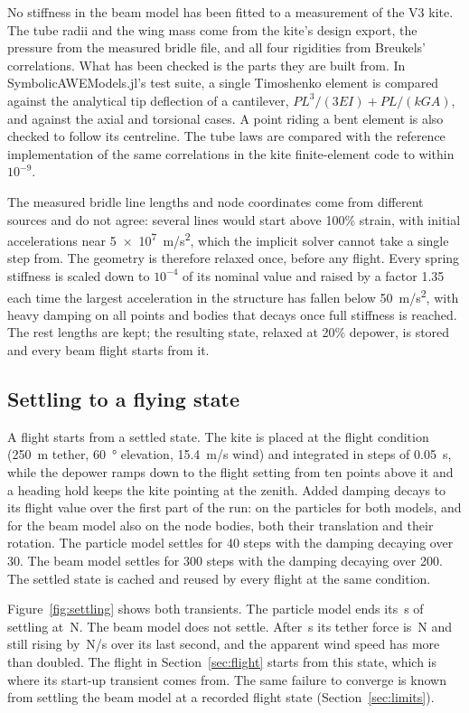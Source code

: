 \documentclass[11pt,a4paper]{article}
\begin{document}
No stiffness in the beam model has been fitted to a measurement of the V3 kite. The tube radii and the wing mass come from the kite's design export, the pressure from the measured bridle file, and all four rigidities from Breukels' correlations. What has been checked is the parts they are built from. In SymbolicAWEModels.jl's test suite, a single Timoshenko element is compared against the analytical tip deflection of a cantilever, $PL^3/(3EI)+PL/(kGA)$, and against the axial and torsional cases. A point riding a bent element is also checked to follow its centreline. The tube laws are compared with the reference implementation of the same correlations in the kite finite-element code to within $10^{-9}$.

The measured bridle line lengths and node coordinates come from different sources and do not agree: several lines would start above 100\% strain, with initial accelerations near \SI{5e7}{m/s^2}, which the implicit solver cannot take a single step from. The geometry is therefore relaxed once, before any flight. Every spring stiffness is scaled down to $10^{-4}$ of its nominal value and raised by a factor 1.35 each time the largest acceleration in the structure has fallen below \SI{50}{m/s^2}, with heavy damping on all points and bodies that decays once full stiffness is reached. The rest lengths are kept; the resulting state, relaxed at 20\% depower, is stored and every beam flight starts from it.

\subsection{Settling to a flying state}

A flight starts from a settled state. The kite is placed at the flight condition (\SI{250}{m} tether, \SI{60}{\degree} elevation, \SI{15.4}{m/s} wind) and integrated in steps of \SI{0.05}{s}, while the depower ramps down to the flight setting from ten points above it and a heading hold keeps the kite pointing at the zenith. Added damping decays to its flight value over the first part of the run: on the particles for both models, and for the beam model also on the node bodies, both their translation and their rotation. The particle model settles for 40 steps with the damping decaying over 30. The beam model settles for 300 steps with the damping decaying over 200. The settled state is cached and reused by every flight at the same condition.

Figure~\ref{fig:settling} shows both transients. The particle model ends its \SettleTimePsm{}\,s of settling at \SettleEndForcePsm{}\,N. The beam model does not settle. After \SettleTimeBeam{}\,s its tether force is \SettleEndForceBeam{}\,N and still rising by \SettleEndForceRateBeam{}\,N/s over its last second, and the apparent wind speed has more than doubled. The flight in Section~\ref{sec:flight} starts from this state, which is where its start-up transient comes from. The same failure to converge is known from settling the beam model at a recorded flight state (Section~\ref{sec:limits}).
\end{document}
